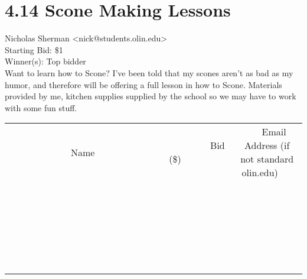 \documentclass[11pt]{article}
\begin{document}
					\section*{4.14 Scone Making Lessons}
					Nicholas Sherman <nick@students.olin.edu> \\
					Starting Bid: \$1 \\
					Winner(s): Top bidder \\
					Want to learn how to Scone? I've been told that my scones aren't as bad as my humor, and therefore will be offering a full lesson in how to Scone. Materials provided by me, kitchen supplies supplied by the school so we may have to work with some fun stuff. \\
					[6ex]
					\begin{tabular}{c c c}
						~~~~~~~~~~~~~Name~~~~~~~~~~~~~ & ~~~~~~~~~Bid (\$)~~~~~~~~~ & ~~~Email Address (if not standard olin.edu)~~~ \\
				
 & & \\
\hline
 & & \\
\hline
 & & \\
\hline
 & & \\
\hline
 & & \\
\hline
 & & \\
\hline
 & & \\
\hline
 & & \\
\hline
 & & \\
\hline
 & & \\
\hline
 & & \\
\hline
 & & \\
\hline
 & & \\
\hline
 & & \\
\hline
 & & \\
\hline
 & & \\
\hline
 & & \\
\hline
 & & \\
\hline
 & & \\
\hline
 & & \\
\hline
 & & \\
\hline
 & & \\
\hline
 & & \\
\hline
 & & \\
\hline
 & & \\
\hline
 & & \\
\hline
					\end{tabular}
					\clearpage
				
\end{document}

